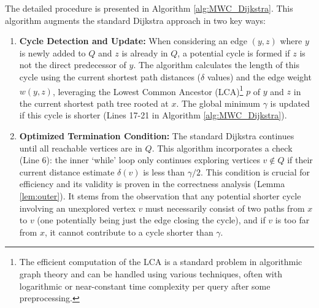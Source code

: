 \documentclass{article}
\begin{document}
The detailed procedure is presented in Algorithm \ref{alg:MWC_Dijkstra}. This algorithm augments the standard Dijkstra approach in two key ways:
\begin{enumerate}
    \item \textbf{Cycle Detection and Update:} When considering an edge $(y, z)$ where $y$ is newly added to $Q$ and $z$ is already in $Q$, a potential cycle is formed if $z$ is not the direct predecessor of $y$. The algorithm calculates the length of this cycle using the current shortest path distances ($\delta$ values) and the edge weight $w(y,z)$, leveraging the Lowest Common Ancestor (LCA)\footnote{The efficient computation of the LCA is a standard problem in algorithmic graph theory \cite{OnlineLCA} and can be handled using various techniques, often with logarithmic or near-constant time complexity per query after some preprocessing.} $p$ of $y$ and $z$ in the current shortest path tree rooted at $x$. The global minimum $\gamma$ is updated if this cycle is shorter (Lines 17-21 in Algorithm \ref{alg:MWC_Dijkstra}).
    \item \textbf{Optimized Termination Condition:} The standard Dijkstra continues until all reachable vertices are in $Q$. This algorithm incorporates a check (Line 6): the inner `while' loop only continues exploring vertices $v \notin Q$ if their current distance estimate $\delta(v)$ is less than $\gamma/2$. This condition is crucial for efficiency and its validity is proven in the correctness analysis (Lemma \ref{lem:outer}). It stems from the observation that any potential shorter cycle involving an unexplored vertex $v$ must necessarily consist of two paths from $x$ to $v$ (one potentially being just the edge closing the cycle), and if $v$ is too far from $x$, it cannot contribute to a cycle shorter than $\gamma$.
\end{enumerate}
\end{document}
